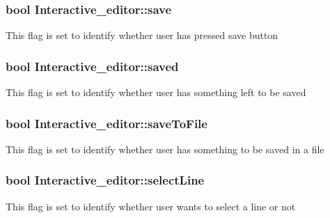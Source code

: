 \subsubsection[{\texorpdfstring{save}{save}}]{\setlength{\rightskip}{0pt plus 5cm}bool Interactive\+\_\+editor\+::save}\hypertarget{classInteractive__editor_a7af788147541bfc20163c1c2a8550cbe}{}\label{classInteractive__editor_a7af788147541bfc20163c1c2a8550cbe}
This flag is set to identify whether user has pressed save button 
\subsubsection[{\texorpdfstring{saved}{saved}}]{\setlength{\rightskip}{0pt plus 5cm}bool Interactive\+\_\+editor\+::saved}\hypertarget{classInteractive__editor_a2e6cd28cc09c6250bb5aa720acfc16a4}{}\label{classInteractive__editor_a2e6cd28cc09c6250bb5aa720acfc16a4}
This flag is set to identify whether user has something left to be saved 
\subsubsection[{\texorpdfstring{save\+To\+File}{saveToFile}}]{\setlength{\rightskip}{0pt plus 5cm}bool Interactive\+\_\+editor\+::save\+To\+File}\hypertarget{classInteractive__editor_a82aa208ba6d10c885699d227d928c82c}{}\label{classInteractive__editor_a82aa208ba6d10c885699d227d928c82c}
This flag is set to identify whether user has something to be saved in a file 
\subsubsection[{\texorpdfstring{select\+Line}{selectLine}}]{\setlength{\rightskip}{0pt plus 5cm}bool Interactive\+\_\+editor\+::select\+Line}\hypertarget{classInteractive__editor_a69d697425045525e2aadd2eb956fce24}{}\label{classInteractive__editor_a69d697425045525e2aadd2eb956fce24}
This flag is set to identify whether user wants to select a line or not 
